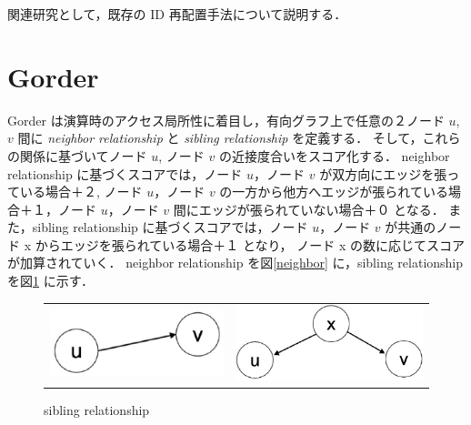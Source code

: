 関連研究として，既存の ID 再配置手法について説明する．
\section{Gorder}
Gorder\cite{wei2016speedup} は演算時のアクセス局所性に着目し，有向グラフ上で任意の２ノード $u$, $v$ 間に \textit{neighbor relationship} と \textit{sibling relationship} を定義する．
そして，これらの関係に基づいてノード $u$, ノード $v$ の近接度合いをスコア化する．
neighbor relationship に基づくスコアでは，ノード $u$，ノード $v$ が双方向にエッジを張っている場合＋２,
ノード $u$，ノード $v$ の一方から他方へエッジが張られている場合＋１，ノード $u$，ノード $v$ 間にエッジが張られていない場合＋０ となる．
また，sibling relationship に基づくスコアでは，ノード $u$，ノード $v$ が共通のノード x からエッジを張られている場合＋１ となり，
ノード x の数に応じてスコアが加算されていく．
neighbor relationship を図\ref{neighbor} に，sibling relationship を図\ref{sibling} に示す． 
\begin{figure}[t]
  \begin{tabular}{cc}
    \begin{minipage}[t]{0.45\hsize}
      \centering
      \includegraphics[width=6.5cm]{./figure/neighbor.pdf}
      \caption{neighbor relationship}
      \label{neighbor}
    \end{minipage} &
    \begin{minipage}[t]{0.45\hsize}
      \centering
      \includegraphics[width=7cm]{./figure/sibling.pdf}
      \caption{sibling relationship}
      \label{sibling}
    \end{minipage}
  \end{tabular}
\end{figure}
